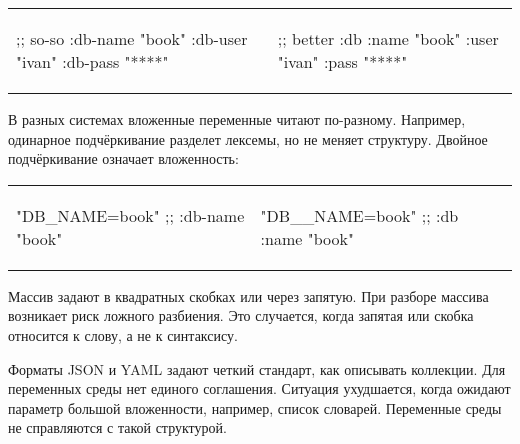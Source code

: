 \noindent
\begin{tabular}{ @{}p{5cm} @{}p{5cm} }

\begin{english}
  \begin{clojure}
;; so-so
{:db-name "book"
 :db-user "ivan"
 :db-pass "****"}
  \end{clojure}
\end{english}

&

\begin{english}
  \begin{clojure}
;; better
{:db {:name "book"
      :user "ivan"
      :pass "****"}}
  \end{clojure}
\end{english}

\end{tabular}

В разных системах вложенные переменные читают по-разному. Например, одинарное
подч\"{е}ркивание разделет лексемы, но не меняет структуру. Двойное подч\"{е}ркивание
означает вложенность:

\noindent
\begin{tabular}{ @{}p{5cm} @{}p{5cm} }

\begin{english}
  \begin{clojure}
"DB_NAME=book"
;; {:db-name "book"}
  \end{clojure}
\end{english}

&

\begin{english}
  \begin{clojure}
"DB__NAME=book"
;; {:db {:name "book"}}
  \end{clojure}
\end{english}

\end{tabular}


Массив задают в квадратных скобках или через запятую. При разборе массива
возникает риск ложного разбиения. Это случается, когда запятая или скобка
относится к слову, а не к синтаксису.


Форматы JSON и YAML задают четкий стандарт, как описывать коллекции. Для
переменных среды нет единого соглашения. Ситуация ухудшается, когда ожидают
параметр большой вложенности, например, список словарей. Переменные среды не
справляются с такой структурой.

